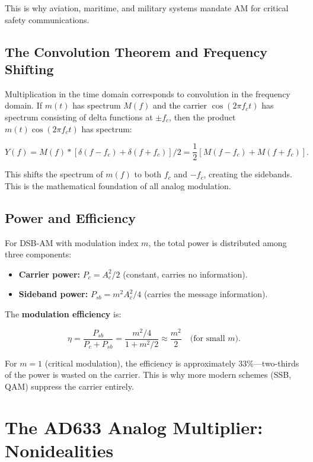 \documentclass[11pt,letterpaper]{article}
\begin{document}
\noindent
This is why aviation, maritime, and military systems mandate AM for critical safety communications.

\subsection{The Convolution Theorem and Frequency Shifting}

Multiplication in the time domain corresponds to convolution in the frequency domain. If $m(t)$ has spectrum $M(f)$ and the carrier $\cos(2 \pi f_c t)$ has spectrum consisting of delta functions at $\pm f_c$, then the product $m(t) \cos(2 \pi f_c t)$ has spectrum:

\begin{equation}
Y(f) = M(f) * [\delta(f - f_c) + \delta(f + f_c)] / 2 = \frac{1}{2}[M(f - f_c) + M(f + f_c)].
\end{equation}

\noindent
This shifts the spectrum of $m(f)$ to both $f_c$ and $-f_c$, creating the sidebands. This is the mathematical foundation of all analog modulation.

\subsection{Power and Efficiency}

For DSB-AM with modulation index $m$, the total power is distributed among three components:
\begin{itemize}
    \item \textbf{Carrier power:} $P_c = A_c^2 / 2$ (constant, carries no information).
    \item \textbf{Sideband power:} $P_{sb} = m^2 A_c^2 / 4$ (carries the message information).
\end{itemize}

\noindent
The \textbf{modulation efficiency} is:

\begin{equation}
\eta = \frac{P_{sb}}{P_c + P_{sb}} = \frac{m^2 / 4}{1 + m^2 / 2} \approx \frac{m^2}{2} \quad \text{(for small } m \text{)}.
\end{equation}

\noindent
For $m = 1$ (critical modulation), the efficiency is approximately 33\%—two-thirds of the power is wasted on the carrier. This is why more modern schemes (SSB, QAM) suppress the carrier entirely.

\section{The AD633 Analog Multiplier: Nonidealities}
\end{document}
